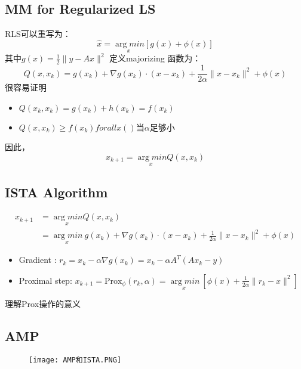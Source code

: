 \subsection{MM for Regularized LS}
RLS可以重写为：
\begin{equation}
    \hat{x}=\underset{x}{\arg min}[g(x)+\phi(x)]
\end{equation}
其中$g(x)=\frac{1}{2}\|y-Ax\|^2$
定义majorizing 函数为：
\begin{equation}
    Q(x,x_k)=g(x_k)+\nabla g(x_k)\cdot (x-x_k)+\frac{1}{2\alpha}\|x-x_k\|^2+\phi(x)
\end{equation}
很容易证明
\begin{itemize}
    \item $Q(x_k,x_k)=g(x_k)+h(x_k)=f(x_k)$
    \item $Q(x,x_k)\geq f(x_k) for all x()$当$\alpha$足够小
\end{itemize}
因此，\begin{equation}
    x_{k+1}=\underset{x}{\arg min}Q(x,x_k)
\end{equation}
\subsection{ISTA Algorithm}
\begin{equation}
    \begin{aligned}
    x_{k+1}&=\underset{x}{\arg min}Q(x,x_k) \\
    &=\underset{x}{\arg min}\ g(x_k)+\nabla g(x_k)  \cdot  (x-x_k)+\frac{1}{2\alpha}\|x-x_k\|^2+\phi(x)
    \end{aligned}
\end{equation}
{\color{purple}{Iterative Soft Threshold Algorithm:}}
\begin{itemize}
    \item Gradient : $r_k=x_k-\alpha \nabla g(x_k)=x_k-\alpha A^T(Ax_k-y)$
    \item Proximal step: $x_{k+1}=\text{Prox}_{\phi}(r_k,\alpha)=\underset{x}{\arg min}\ [\phi(x)+\frac{1}{2\alpha}\|r_k-x\|^2] $
\end{itemize}
理解Prox操作的意义
\subsection{AMP}
\begin{figure}
    \texttt{[image: AMP和ISTA.PNG]}
\end{figure}